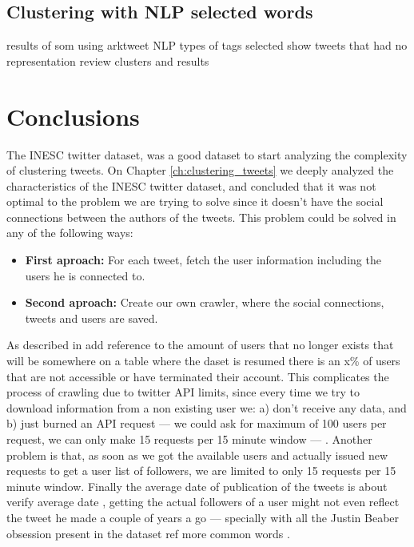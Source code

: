 \subsection{Clustering with NLP selected words}
\label{sub:clustering_with_nlp_selected_words}
{\color{red} results of som using arktweet NLP }
{\color{red} types of tags selected }
{\color{red} show tweets that had no representation }
{\color{red} review clusters and results }


\section{Conclusions}
\label{sec:conclusions}


\label{chap:crawling_twitter}
The INESC twitter dataset, was a good dataset to start analyzing the complexity of clustering tweets. On Chapter \ref{ch:clustering_tweets} we deeply analyzed the characteristics of the INESC twitter dataset, and concluded that it was not optimal to the problem we are trying to solve since it doesn't have the social connections between the authors of the tweets. This problem could be solved in any of the following ways:
\begin{itemize}
  \item \textbf{First aproach: } For each tweet, fetch the user information including the users he is connected to.
  \item \textbf{Second aproach: } Create our own crawler, where the social connections, tweets and users are saved.
\end{itemize}

As described in {\color{red} add reference to the amount of users that no longer exists that will be somewhere on a table where the daset is resumed } there is an x\% of users that are not accessible or have terminated their account. This complicates the process of crawling due to twitter API limits, since every time we try to download information from a non existing user we: a) don't receive any data, and b) just burned an API request --- we could ask for maximum of 100 users per request, we can only make 15 requests per 15 minute window --- . Another problem is that, as soon as we got the available users and actually issued new requests to get a user list of followers, we are limited to only 15 requests per 15 minute window. Finally the average date of publication of the tweets is about {\color{red} verify average date }, getting the actual followers of a user might not even reflect the tweet he made a couple of years a go --- specially with all the Justin Beaber obsession present in the dataset {\color{red} ref more common words }.


